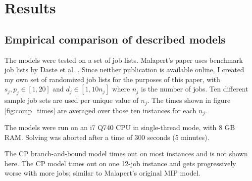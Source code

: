 \newpage
\chapter{Results}
\section{Empirical comparison of described models}\label{sec:results}
The models were tested on a set of job lists. Malapert's paper uses benchmark
job lists by Daste et al. \cite{daste1, daste2}. Since neither publication is
available online, I created my own set of randomized job lists for the purposes
of this paper, with $s_j, p_j \in [1, 20]$ and $d_j \in [1, 10n_j]$ where $n_j$ is
the number of jobs. Ten different sample job sets are used per unique value of
$n_j$. The times shown in figure \ref{fig:comp_times} are averaged over those
ten instances for each $n_j$.

The  models were run on an i7 Q740 CPU in single-thread mode, with 8 GB RAM.
Solving was aborted after a time of 300 seconds (5 minutes).

The CP branch-and-bound model times out on most instances and is not shown here.
The CP model times out on one 12-job instance and gets progressively worse with
more jobs; similar to Malapert's original MIP model.



